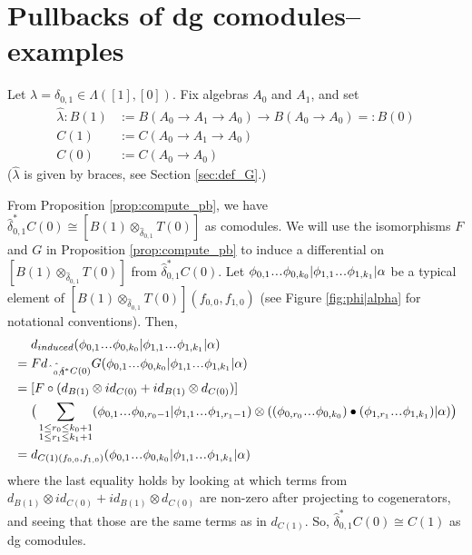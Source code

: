 \section{Pullbacks of dg comodules--examples}\label{sec:pb_example}
%
\begin{eg} \label{eg:pb}
Let $\lambda = \delta_{0,1} \in \Lambda([1], [0])$. 
Fix algebras $A_0$ and $A_1$, and set 
\begin{align*}
\hat{\lambda}: B(1) 
&:= B(A_0 \to A_1 \to A_0) \to 
  B(A_0 \to A_0) =: B(0)\\
C(1) 
&:= C(A_0 \to A_1 \to A_0)\\
C(0) 
&:= C(A_0 \to A_0)
\end{align*}
($\hat{\lambda}$ is given by braces, 
see Section \ref{sec:def_G}.)

From Proposition \ref{prop:compute_pb}, we 
have $\hat{\delta}_{0,1}^* C(0) \cong
[B(1) \otimes_{\hat{\delta}_{0,1}} T(0)]$ 
as comodules. We will use the isomorphisms 
$F$ and $G$ in Proposition \ref{prop:compute_pb} 
to induce a differential on 
$[B(1) \otimes_{\hat{\delta}_{0,1}} T(0)]$ 
from $\hat{\delta}_{0,1}^* C(0)$.
Let 
$\phi_{0,1} \smdots \phi_{0,k_0} |
\phi_{1,1} \smdots \phi_{1,k_1} |
\alpha$ be a typical element of 
$[B(1) \otimes_{\hat{\delta}_{0,1}} 
  T(0)](f_{0,0},f_{1,0})$
(see Figure \ref{fig:phi|alpha} for 
notational conventions). Then,
\begin{align*}
& \phantom{{}={}}
d_{induced}
(\phi_{0,1} \smdots \phi_{0,k_0} |
\phi_{1,1} \smdots \phi_{1,k_1} |\alpha)\\
&=
Fd_{\hat{\hat{\delta}_{0,1}}^*C(0)}G
(\phi_{0,1} \smdots \phi_{0,k_0} |
\phi_{1,1} \smdots \phi_{1,k_1} |\alpha) \\
&=
[F \circ (d_{B(1)}\otimes id_{C(0)} + 
  id_{B(1)} \otimes d_{C(0)})] \\
& \phantom{{}=  {}}
\big( \sum \limits_{\substack{1 \leq r_0 \leq k_0+1 \\ 
1 \leq r_1 \leq k_1+1}}
(\phi_{0,1} \smdots \phi_{0,r_0-1} |
\phi_{1,1} \smdots \phi_{1,r_1-1} ) \otimes 
((\phi_{0,r_0}\smdots \phi_{0,k_0}) \bullet 
(\phi_{1,r_1}\smdots \phi_{1,k_1}) |\alpha) \big) \\
&= 
d_{C(1)(f_{0,0},f_{1,0})}
(\phi_{0,1} \smdots \phi_{0,k_0} |
\phi_{1,1} \smdots \phi_{1,k_1} |\alpha)
\end{align*}
where the last equality holds by looking at which 
terms from $d_{B(1)}\otimes id_{C(0)} + 
id_{B(1)} \otimes d_{C(0)}$ 
are non-zero after projecting to cogenerators, and 
seeing that those are the same terms as in 
$d_{C(1)}$. So, $\hat{\delta}_{0,1}^*C(0) \cong C(1)$ as 
dg comodules. 
\end{eg}
